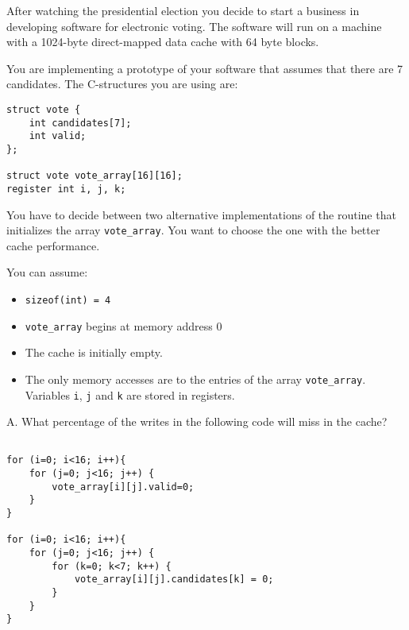 \begin{problem}{7}

After watching the presidential election you decide to
start a business in developing software for electronic voting.
The software will run
on a machine with a 1024-byte direct-mapped data cache with 64 byte blocks.

You are implementing a prototype of your software that
assumes that there are 7 candidates. The C-structures you are using are:

\begin{verbatim}
struct vote {
    int candidates[7];
    int valid;
};

struct vote vote_array[16][16];
register int i, j, k;

\end{verbatim}

You have to decide between two alternative implementations of the routine
that initializes the array \verb|vote_array|. You
want to choose the one with the better cache performance.

You can assume:
\begin{itemize}
\item \verb|sizeof(int) = 4|
\item \verb|vote_array| begins at memory address 0
\item The cache is initially empty.
\item The only memory accesses are to the entries of the array \verb|vote_array|. 
Variables \verb|i|, \verb|j| and \verb|k| are stored in registers.
\end{itemize}

\end{problem}

A. What percentage of the writes in the following code will miss in the cache?

\begin{verbatim}

for (i=0; i<16; i++){
    for (j=0; j<16; j++) {
        vote_array[i][j].valid=0;
    }
}

for (i=0; i<16; i++){
    for (j=0; j<16; j++) {
        for (k=0; k<7; k++) {
            vote_array[i][j].candidates[k] = 0;
        }
    }
}

\end{verbatim}


\vspace{0.25in}

